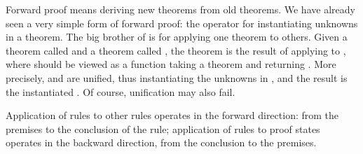 \begin{isabellebody}
\begin{isamarkuptext}
Forward proof means deriving new theorems from old theorems. We have already
seen a very simple form of forward proof: the  operator for
instantiating unknowns in a theorem. The big brother of  is  for applying one theorem to others. Given a theorem  called
 and a theorem  called , the theorem  is the result of applying  to , where  should be viewed as a function taking a theorem  and returning
.  More precisely,  and  are unified, thus
instantiating the unknowns in , and the result is the instantiated
. Of course, unification may also fail.
\begin{warn}
Application of rules to other rules operates in the forward direction: from
the premises to the conclusion of the rule; application of rules to proof
states operates in the backward direction, from the conclusion to the
premises.
\end{warn}


\end{isamarkuptext}
\end{isabellebody}
